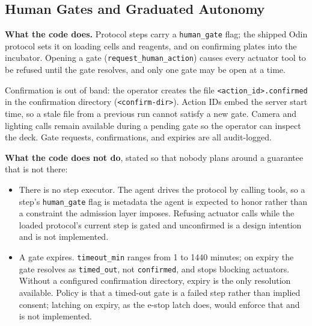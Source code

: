 \documentclass[11pt,letterpaper]{article}
\begin{document}
\subsection{Human Gates and Graduated Autonomy}
\label{sec:gates}

\textbf{What the code does.} Protocol steps carry a \texttt{human\_gate} flag; the shipped Odin protocol sets it on loading cells and reagents, and on confirming plates into the incubator. Opening a gate (\texttt{request\_human\_action}) causes every actuator tool to be refused until the gate resolves, and only one gate may be open at a time.

Confirmation is out of band: the operator creates the file \texttt{<action\_id>.confirmed} in the confirmation directory (\texttt{<confirm-dir>}). Action IDs embed the server start time, so a stale file from a previous run cannot satisfy a new gate. Camera and lighting calls remain available during a pending gate so the operator can inspect the deck. Gate requests, confirmations, and expiries are all audit-logged.

\textbf{What the code does not do}, stated so that nobody plans around a guarantee that is not there:

\begin{itemize}
  \item There is no step executor. The agent drives the protocol by calling tools, so a step's \texttt{human\_gate} flag is metadata the agent is expected to honor rather than a constraint the admission layer imposes. Refusing actuator calls while the loaded protocol's current step is gated and unconfirmed is a design intention and is not implemented.
  \item A gate expires. \texttt{timeout\_min} ranges from 1 to 1440 minutes; on expiry the gate resolves as \texttt{timed\_out}, not \texttt{confirmed}, and stops blocking actuators. Without a configured confirmation directory, expiry is the only resolution available. Policy is that a timed-out gate is a failed step rather than implied consent; latching on expiry, as the e-stop latch does, would enforce that and is not implemented.
\end{itemize}
\end{document}
